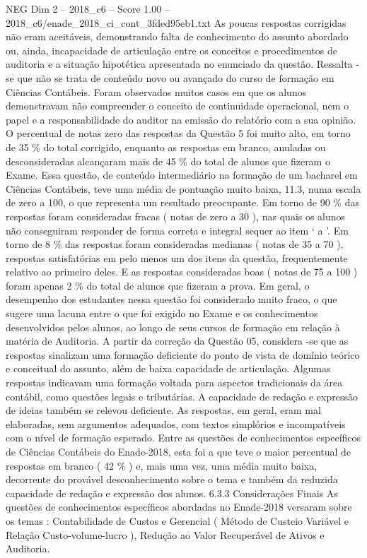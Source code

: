 \begin{textsample}{NEG Dim 2 – 2018\_c6 – Score 1.00 – 2018\_c6/enade\_2018\_ci\_cont\_3fded95eb1.txt}
As poucas respostas corrigidas não eram aceitáveis, demonstrando falta de conhecimento do assunto abordado ou, ainda, incapacidade de articulação entre os conceitos e procedimentos de auditoria e a situação hipotética apresentada no enunciado da questão.
Ressalta -se que não se trata de conteúdo novo ou avançado do curso de formação em Ciências Contábeis.
Foram observados muitos casos em que os alunos demonstravam não compreender o conceito de continuidade operacional, nem o papel e a responsabilidade do auditor na emissão do relatório com a sua opinião.
O percentual de notas zero das respostas da Questão 5 foi muito alto, em torno de 35 \% do total corrigido, enquanto as respostas em branco, anuladas ou desconsideradas alcançaram mais de 45 \% do total de alunos que fizeram o Exame.
Essa questão, de conteúdo intermediário na formação de um bacharel em Ciências Contábeis, teve uma média de pontuação muito baixa, 11.3, numa escala de zero a 100, o que representa um resultado preocupante.
Em torno de 90 \% das respostas foram consideradas fracas ( notas de zero a 30 ), nas quais os alunos não conseguiram responder de forma correta e integral sequer ao item ‘ a ’.
Em torno de 8 \% das respostas foram consideradas medianas ( notas de 35 a 70 ), respostas satisfatórias em pelo menos um dos itens da questão, frequentemente relativo ao primeiro deles.
E as respostas consideradas boas ( notas de 75 a 100 ) foram apenas 2 \% do total de alunos que fizeram a prova.
Em geral, o desempenho dos estudantes nessa questão foi considerado muito fraco, o que sugere uma lacuna entre o que foi exigido no Exame e os conhecimentos desenvolvidos pelos alunos, ao longo de seus cursos de formação em relação à matéria de Auditoria.
A partir da correção da Questão 05, considera -se que as respostas sinalizam uma formação deficiente do ponto de vista de domínio teórico e conceitual do assunto, além de baixa capacidade de articulação.
Algumas respostas indicavam uma formação voltada para aspectos tradicionais da área contábil, como questões legais e tributárias.
A capacidade de redação e expressão de ideias também se relevou deficiente.
As respostas, em geral, eram mal elaboradas, sem argumentos adequados, com textos simplórios e incompatíveis com o nível de formação esperado.
Entre as questões de conhecimentos específicos de Ciências Contábeis do Enade-2018, esta foi a que teve o maior percentual de respostas em branco ( 42 \% ) e, mais uma vez, uma média muito baixa, decorrente do provável desconhecimento sobre o tema e também da reduzida capacidade de redação e expressão dos alunos. 6.3.3 Considerações Finais As questões de conhecimentos específicos abordadas no Enade-2018 versaram sobre os temas : Contabilidade de Custos e Gerencial ( Método de Custeio Variável e Relação Custo-volume-lucro ), Redução ao Valor Recuperável de Ativos e Auditoria.

\end{textsample}
